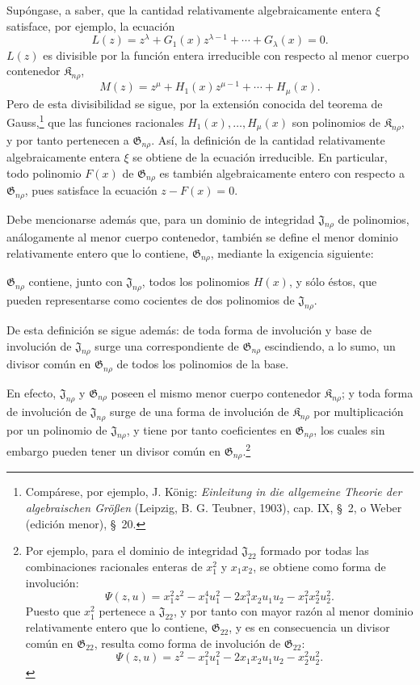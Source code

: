 \documentclass[11pt]{article}
\providecommand{\Kfield}{\mathfrak{K}}
\providecommand{\Jdom}{\mathfrak{J}}
\providecommand{\Gdom}{\mathfrak{G}}
\begin{document}
Supóngase, a saber, que la cantidad relativamente algebraicamente entera $\xi$ satisface, por ejemplo, la ecuación
\[
  L(z)=z^\lambda+G_1(x)z^{\lambda-1}+\cdots+G_\lambda(x)=0.
\]
$L(z)$ es divisible por la función entera irreducible con respecto al menor cuerpo contenedor $\Kfield_{n\rho}$,
\[
  M(z)=z^\mu+H_1(x)z^{\mu-1}+\cdots+H_\mu(x).
\]
Pero de esta divisibilidad se sigue, por la extensión conocida del teorema de Gauss,\footnote{Compárese, por ejemplo, J. König: \emph{Einleitung in die allgemeine Theorie der algebraischen Größen} (Leipzig, B. G. Teubner, 1903), cap. IX, \S\ 2, o Weber (edición menor), \S\ 20.} que las funciones racionales $H_1(x),\ldots,H_\mu(x)$ son polinomios de $\Kfield_{n\rho}$, y por tanto pertenecen a $\Gdom_{n\rho}$. Así, la definición de la cantidad relativamente algebraicamente entera $\xi$ se obtiene de la ecuación irreducible. En particular, todo polinomio $F(x)$ de $\Gdom_{n\rho}$ es también algebraicamente entero con respecto a $\Gdom_{n\rho}$, pues satisface la ecuación $z-F(x)=0$.

Debe mencionarse además que, para un dominio de integridad $\Jdom_{n\rho}$ de polinomios, análogamente al menor cuerpo contenedor, también se define el menor dominio relativamente entero que lo contiene, $\Gdom_{n\rho}$, mediante la exigencia siguiente:

$\Gdom_{n\rho}$ contiene, junto con $\Jdom_{n\rho}$, todos los polinomios $H(x)$, y sólo éstos, que pueden representarse como cocientes de dos polinomios de $\Jdom_{n\rho}$.

De esta definición se sigue además: de toda forma de involución y base de involución de $\Jdom_{n\rho}$ surge una correspondiente de $\Gdom_{n\rho}$ escindiendo, a lo sumo, un divisor común en $\Gdom_{n\rho}$ de todos los polinomios de la base.

En efecto, $\Jdom_{n\rho}$ y $\Gdom_{n\rho}$ poseen el mismo menor cuerpo contenedor $\Kfield_{n\rho}$; y toda forma de involución de $\Jdom_{n\rho}$ surge de una forma de involución de $\Kfield_{n\rho}$ por multiplicación por un polinomio de $\Jdom_{n\rho}$, y tiene por tanto coeficientes en $\Gdom_{n\rho}$, los cuales sin embargo pueden tener un divisor común en $\Gdom_{n\rho}$.\footnote{Por ejemplo, para el dominio de integridad $\Jdom_{22}$ formado por todas las combinaciones racionales enteras de $x_1^2$ y $x_1x_2$, se obtiene como forma de involución:
\[
\Psi(z,u)=x_1^2z^2-x_1^4u_1^2-2x_1^3x_2u_1u_2-x_1^2x_2^2u_2^2.
\]
Puesto que $x_1^2$ pertenece a $\Jdom_{22}$, y por tanto con mayor razón al menor dominio relativamente entero que lo contiene, $\Gdom_{22}$, y es en consecuencia un divisor común en $\Gdom_{22}$, resulta como forma de involución de $\Gdom_{22}$:
\[
\Psi(z,u)=z^2-x_1^2u_1^2-2x_1x_2u_1u_2-x_2^2u_2^2.
\]}
\end{document}
